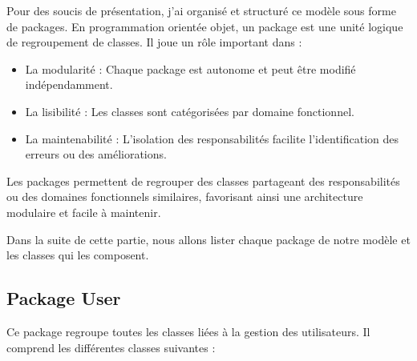 Pour des soucis de présentation, j'ai organisé et structuré ce modèle sous forme de packages. En programmation orientée objet, un package est une unité logique de regroupement de classes. Il joue un rôle important dans :

\vspace{0.4cm}
\begin{itemize}
    \item La modularité : Chaque package est autonome et peut être modifié indépendamment.
    \item La lisibilité : Les classes sont catégorisées par domaine fonctionnel.
    \item La maintenabilité : L'isolation des responsabilités facilite l'identification des erreurs ou des améliorations.
\end{itemize}

\vspace{0.4cm}
Les packages permettent de regrouper des classes partageant des responsabilités ou des domaines fonctionnels similaires, favorisant ainsi une architecture modulaire et facile à maintenir. 

\vspace{0.4cm}

Dans la suite de cette partie, nous allons lister chaque package de notre modèle et les classes qui les composent. 

\subsection{Package User}
Ce package regroupe toutes les classes liées à la gestion des utilisateurs.
Il comprend les différentes classes suivantes :

\vspace{0.35cm}

